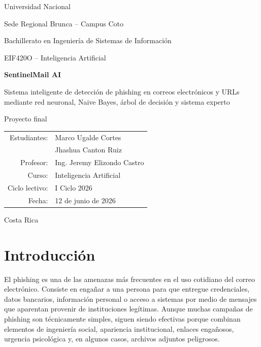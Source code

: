 \documentclass[12pt,letterpaper]{article}
\begin{document}
\begin{titlepage}
    \centering
    \vspace*{1cm}
    {\Large Universidad Nacional\par}
    {\large Sede Regional Brunca -- Campus Coto\par}
    {\large Bachillerato en Ingeniería de Sistemas de Información\par}
    \vspace{1.5cm}
    {\large EIF420O -- Inteligencia Artificial\par}
    \vspace{2cm}
    {\Huge\bfseries SentinelMail AI\par}
    \vspace{0.4cm}
    {\Large Sistema inteligente de detección de phishing en correos electrónicos y URLs mediante red neuronal, Naive Bayes, árbol de decisión y sistema experto\par}
    \vspace{2cm}
    {\large Proyecto final\par}
    \vspace{1cm}
    \begin{tabular}{rl}
        Estudiantes: & Marco Ugalde Cortes \\
                     & Jhashua Canton Ruiz \\
        Profesor: & Ing. Jeremy Elizondo Castro \\
        Curso: & Inteligencia Artificial \\
        Ciclo lectivo: & I Ciclo 2026 \\
        Fecha: & 12 de junio de 2026 \\
    \end{tabular}
    \vfill
    {\large Costa Rica\par}
\end{titlepage}

\tableofcontents
\newpage

\section{Introducción}

El phishing es una de las amenazas más frecuentes en el uso cotidiano del correo electrónico. Consiste en engañar a una persona para que entregue credenciales, datos bancarios, información personal o acceso a sistemas por medio de mensajes que aparentan provenir de instituciones legítimas. Aunque muchas campañas de phishing son técnicamente simples, siguen siendo efectivas porque combinan elementos de ingeniería social, apariencia institucional, enlaces engañosos, urgencia psicológica y, en algunos casos, archivos adjuntos peligrosos.
\end{document}
